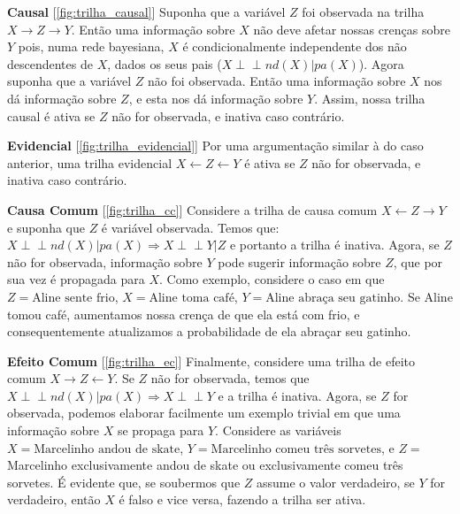 \documentclass[paper=a4, fontsize=11pt]{scrartcl} %
\numberwithin{equation}{subsection}
\numberwithin{figure}{subsection}
\numberwithin{table}{subsection}
\numberwithin{definition}{subsection}
\numberwithin{theorem}{subsection}
\numberwithin{property}{subsection}
\numberwithin{proposition}{subsection}
\numberwithin{equation}{section}
\numberwithin{figure}{section}
\numberwithin{table}{section}
\numberwithin{definition}{section}
\numberwithin{theorem}{section}
\numberwithin{property}{section}
\numberwithin{proposition}{section}
\def\ind{\perp\!\!\!\perp}
\begin{document}
\begin{description}
  \item \textbf{Causal} [\ref{fig:trilha_causal}] Suponha que a variável $Z$ foi observada na trilha $X \rightarrow Z \rightarrow Y$. Então uma informação sobre $X$ não deve afetar nossas crenças sobre $Y$ pois, numa rede bayesiana, $X$ é condicionalmente independente dos não descendentes de $X$, dados os seus pais ($X \ind nd(X) | pa(X)$). Agora suponha que a variável $Z$ não foi observada. Então uma informação sobre $X$ nos dá informação sobre $Z$, e esta nos dá informação sobre $Y$. Assim, nossa trilha causal é ativa se $Z$ não for observada, e inativa caso contrário.
  
  \item \textbf{Evidencial} [\ref{fig:trilha_evidencial}] Por uma argumentação similar à do caso anterior, uma trilha evidencial $X \leftarrow Z \leftarrow Y$ é ativa se $Z$ não for observada, e inativa caso contrário.

  \item \textbf{Causa Comum} [\ref{fig:trilha_cc}] Considere a trilha de causa comum $X \leftarrow Z \rightarrow Y$ e suponha que $Z$ é variável observada. Temos que:
  $X \ind nd(X) | pa(X) \Rightarrow X \ind Y | Z$ e portanto a trilha é inativa. Agora, se $Z$ não for observada, informação sobre $Y$ pode sugerir informação sobre $Z$, que por sua vez é propagada para $X$. Como exemplo, considere o caso em que $Z = \text{Aline sente frio}$, $X = \text{Aline toma café}$, $Y = \text{Aline abraça seu gatinho}$. Se Aline tomou café, aumentamos nossa crença de que ela está com frio, e consequentemente atualizamos a probabilidade de ela abraçar seu gatinho.

  \item \textbf{Efeito Comum} [\ref{fig:trilha_ec}] Finalmente, considere uma trilha de efeito comum $X \rightarrow Z \leftarrow Y$. Se $Z$ não for observada, temos que $X \ind nd(X) | pa(X) \Rightarrow X \ind Y$ e a trilha é inativa. Agora, se $Z$ for observada, podemos elaborar facilmente um exemplo trivial em que uma informação sobre $X$ se propaga para $Y$. Considere as variáveis $X = \text{Marcelinho andou de skate}$, $Y = \text{Marcelinho comeu três sorvetes}$, e $Z =$ Marcelinho exclusivamente andou de skate ou exclusivamente comeu três sorvetes. É evidente que, se soubermos que $Z$ assume o valor verdadeiro, se $Y$ for verdadeiro, então $X$ é falso e vice versa, fazendo a trilha ser ativa.

\end{description}
\end{document}
